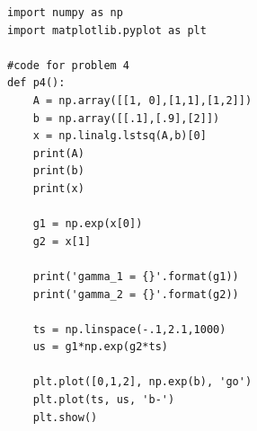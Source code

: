 \documentclass[12pt]{article}
\begin{document}
\begin{lstlisting}
import numpy as np
import matplotlib.pyplot as plt

#code for problem 4
def p4():
	A = np.array([[1, 0],[1,1],[1,2]])
	b = np.array([[.1],[.9],[2]])
	x = np.linalg.lstsq(A,b)[0]
	print(A)
	print(b)
	print(x)
	
	g1 = np.exp(x[0])
	g2 = x[1]
	
	print('gamma_1 = {}'.format(g1))
	print('gamma_2 = {}'.format(g2))
	
	ts = np.linspace(-.1,2.1,1000)
	us = g1*np.exp(g2*ts)
	
	plt.plot([0,1,2], np.exp(b), 'go')
	plt.plot(ts, us, 'b-')
	plt.show()
\end{lstlisting}
\end{document}
